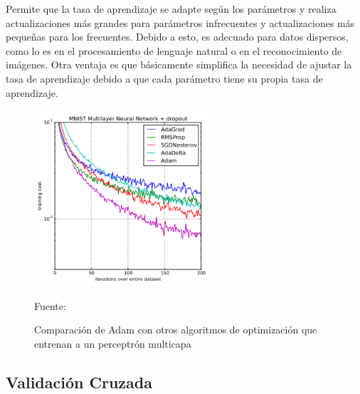 		Permite que la tasa de aprendizaje se adapte según los parámetros y realiza actualizaciones más grandes para parámetros infrecuentes y actualizaciones más pequeñas para los frecuentes. Debido a esto, es adecuado para datos dispersos, como lo es en el procesamiento de lenguaje natural o en el reconocimiento de imágenes. Otra ventaja es que básicamente simplifica la necesidad de ajustar la tasa de aprendizaje debido a que cada parámetro tiene su propia tasa de aprendizaje. 
		\begin{figure}[H]
				\begin{center}
				\includegraphics[width=0.6\textwidth, height=0.4\textheight]{images/desarrollo/adam} 
				\end{center}
				\begin{center}
				\caption{\small{Comparación de Adam con otros algoritmos de optimización que entrenan a un perceptrón multicapa}}
				\vspace{-0.5em}
				{\small{{Fuente: \cite{Adam}}}}
				\end{center}
				\vspace{-1.5em}
			\end{figure}

	\subsection{Validación Cruzada}
	

